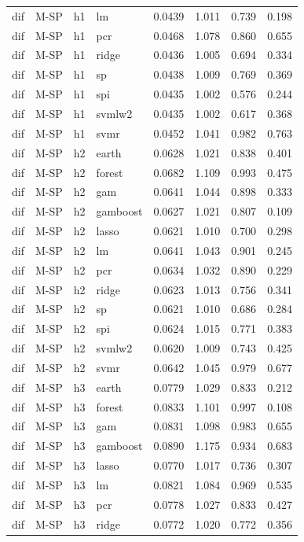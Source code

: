 \begin{ThreePartTable}
\begin{longtable}[t]{llclcccc}
dif & M-SP & h1 & lm & 0.0439 & 1.011 & 0.739 & 0.198\\
dif & M-SP & h1 & pcr & 0.0468 & 1.078 & 0.860 & 0.655\\
dif & M-SP & h1 & ridge & 0.0436 & 1.005 & 0.694 & 0.334\\
dif & M-SP & h1 & sp & 0.0438 & 1.009 & 0.769 & 0.369\\
dif & M-SP & h1 & spi & 0.0435 & 1.002 & 0.576 & 0.244\\
dif & M-SP & h1 & svmlw2 & 0.0435 & 1.002 & 0.617 & 0.368\\
dif & M-SP & h1 & svmr & 0.0452 & 1.041 & 0.982 & 0.763\\
\addlinespace
dif & M-SP & h2 & earth & 0.0628 & 1.021 & 0.838 & 0.401\\
dif & M-SP & h2 & forest & 0.0682 & 1.109 & 0.993 & 0.475\\
dif & M-SP & h2 & gam & 0.0641 & 1.044 & 0.898 & 0.333\\
dif & M-SP & h2 & gamboost & 0.0627 & 1.021 & 0.807 & 0.109\\
dif & M-SP & h2 & lasso & 0.0621 & 1.010 & 0.700 & 0.298\\
dif & M-SP & h2 & lm & 0.0641 & 1.043 & 0.901 & 0.245\\
dif & M-SP & h2 & pcr & 0.0634 & 1.032 & 0.890 & 0.229\\
dif & M-SP & h2 & ridge & 0.0623 & 1.013 & 0.756 & 0.341\\
dif & M-SP & h2 & sp & 0.0621 & 1.010 & 0.686 & 0.284\\
dif & M-SP & h2 & spi & 0.0624 & 1.015 & 0.771 & 0.383\\
dif & M-SP & h2 & svmlw2 & 0.0620 & 1.009 & 0.743 & 0.425\\
dif & M-SP & h2 & svmr & 0.0642 & 1.045 & 0.979 & 0.677\\
\addlinespace
dif & M-SP & h3 & earth & 0.0779 & 1.029 & 0.833 & 0.212\\
dif & M-SP & h3 & forest & 0.0833 & 1.101 & 0.997 & 0.108\\
dif & M-SP & h3 & gam & 0.0831 & 1.098 & 0.983 & 0.655\\
dif & M-SP & h3 & gamboost & 0.0890 & 1.175 & 0.934 & 0.683\\
dif & M-SP & h3 & lasso & 0.0770 & 1.017 & 0.736 & 0.307\\
dif & M-SP & h3 & lm & 0.0821 & 1.084 & 0.969 & 0.535\\
dif & M-SP & h3 & pcr & 0.0778 & 1.027 & 0.833 & 0.427\\
dif & M-SP & h3 & ridge & 0.0772 & 1.020 & 0.772 & 0.356\\

\end{longtable}
\end{ThreePartTable}

